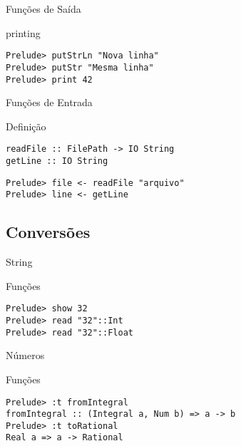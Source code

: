 \documentclass{beamer}
\begin{document}
		\begin{frame}[fragile]{Funções de Saída}
		 \begin{block}{printing}
		  \begin{lstlisting}
Prelude> putStrLn "Nova linha"
Prelude> putStr "Mesma linha"
Prelude> print 42
		  \end{lstlisting}
		 \end{block}
		\end{frame}
		
		\begin{frame}[fragile]{Funções de Entrada}

		 \begin{block}{Definição}
		  \begin{lstlisting}
readFile :: FilePath -> IO String
getLine :: IO String
		  \end{lstlisting}
		 \end{block}
		 
		 \begin{block}{}
		  \begin{lstlisting}
Prelude> file <- readFile "arquivo"
Prelude> line <- getLine
		  \end{lstlisting}
		 \end{block}		 
		\end{frame}

		\subsection{Conversões}

			\begin{frame}[fragile]{String}
			 \begin{block}{Funções}
			  \begin{lstlisting}
Prelude> show 32
Prelude> read "32"::Int
Prelude> read "32"::Float
			  \end{lstlisting}
			 \end{block}
			\end{frame}
			
			\begin{frame}[fragile]{Números}
			 \begin{block}{Funções}
				\begin{lstlisting}
Prelude> :t fromIntegral
fromIntegral :: (Integral a, Num b) => a -> b
Prelude> :t toRational
Real a => a -> Rational
				\end{lstlisting}
			 \end{block}				
			\end{frame}
			
\end{document}
